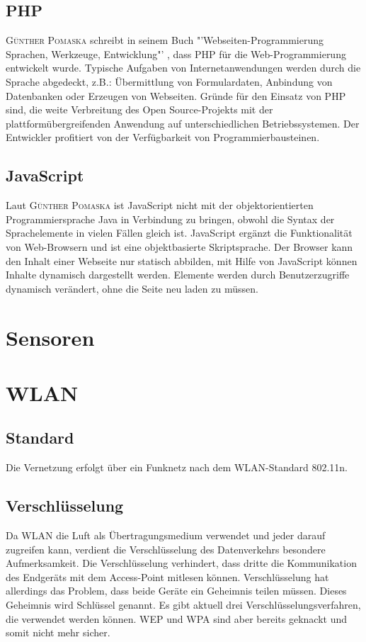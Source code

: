 \subsection{\ac{PHP}}
\textsc{Günther Pomaska} schreibt in seinem Buch "'Webseiten-Programmierung Sprachen, Werkzeuge, Entwicklung"' \cite{pomaska2012webseiten-programmierung}, dass \ac{PHP} für die Web-Programmierung entwickelt wurde. Typische Aufgaben von Internetanwendungen werden durch die Sprache abgedeckt, z.B.: Übermittlung von Formulardaten, Anbindung von Datenbanken oder Erzeugen von Webseiten. Gründe für den Einsatz von \ac{PHP} sind, die weite Verbreitung des Open Source-Projekts mit der plattformübergreifenden Anwendung auf unterschiedlichen Betriebssystemen. Der Entwickler profitiert von der Verfügbarkeit von Programmierbausteinen.

\subsection{JavaScript}
Laut \textsc{Günther Pomaska} \cite{pomaska2012webseiten-programmierung} ist JavaScript nicht mit der objektorientierten Programmiersprache Java in Verbindung zu bringen, obwohl die Syntax der Sprachelemente in vielen Fällen gleich ist. JavaScript ergänzt die Funktionalität von Web-Browsern und ist eine objektbasierte Skriptsprache. Der Browser kann den Inhalt einer Webseite nur statisch abbilden, mit Hilfe von JavaScript können Inhalte dynamisch dargestellt werden. Elemente werden durch Benutzerzugriffe dynamisch verändert, ohne die Seite neu laden zu müssen.

\section{Sensoren}\label{Sensoren_Planung}


\section{WLAN}
\subsection{Standard}
Die Vernetzung erfolgt über ein Funknetz nach dem WLAN-Standard 802.11n. 

\subsection{Verschlüsselung}
Da WLAN die Luft als Übertragungsmedium verwendet und jeder darauf zugreifen kann, verdient die Verschlüsselung des Datenverkehrs besondere Aufmerksamkeit. Die Verschlüsselung verhindert, dass dritte die Kommunikation des Endgeräts mit dem Access-Point mitlesen können. Verschlüsselung hat allerdings das Problem, dass beide Geräte ein Geheimnis teilen müssen. Dieses Geheimnis wird Schlüssel genannt. Es gibt aktuell drei Verschlüsselungsverfahren, die verwendet werden können. \ac{WEP} und \ac{WPA} sind aber bereits geknackt und somit nicht mehr sicher.

